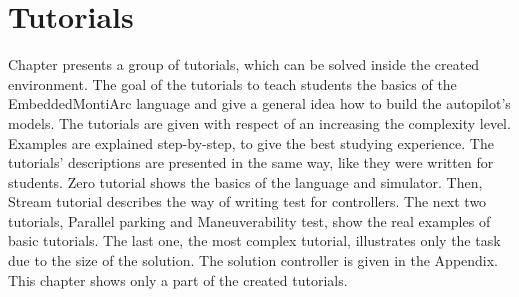 \chapter{Tutorials} \label{sec:tutorials}
Chapter presents a group of tutorials, which can be solved inside the created environment. The goal of the tutorials to teach students the basics of the EmbeddedMontiArc language and give a general idea how to build the autopilot's models. The tutorials are given with respect of an increasing the complexity level. Examples are explained step-by-step, to give the best studying experience. The tutorials' descriptions are presented in the same way, like they were written for students. Zero tutorial shows the basics of the language and simulator. Then, Stream tutorial describes the way of writing test for controllers. The next two tutorials, Parallel parking and Maneuverability test, show the real examples of basic tutorials. The last one, the most complex tutorial, illustrates only the task due to the size of the solution. The solution controller is given in the Appendix. This chapter shows only a part of the created tutorials.

